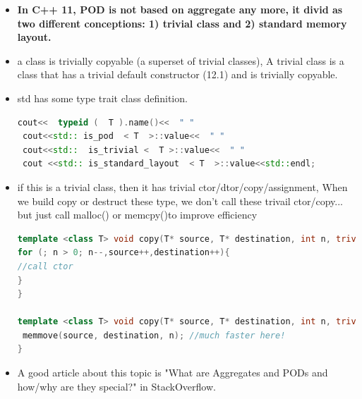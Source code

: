 \documentclass[a4paper,12pt,twoside]{book}
\begin{document}
\begin{itemize}
\item \textbf{In C++ 11, POD is not based on aggregate any more, it divid as two different conceptions: 1) trivial class and 2) standard memory layout. }

\item a class is trivially copyable (a superset of trivial classes), A trivial class is a class that has a trivial default constructor (12.1) and is trivially copyable.

\item std has some type trait class definition. 
\begin{lstlisting}[frame=single, language=c++]
 cout<<  typeid (  T ).name()<<  " "  
 cout<<std:: is_pod  < T  >::value<<  " " 
 cout<<std::  is_trivial <  T >::value<<  " "  
 cout <<std:: is_standard_layout  < T  >::value<<std::endl;
 \end{lstlisting}
 
\item if this is a trivial class, then it has trivial ctor/dtor/copy/assignment, When we build copy or destruct these type, we don't call these trivail ctor/copy... but just call malloc() or memcpy()to improve efficiency 

\begin{lstlisting}[frame=single, language=c++]
template <class T> void copy(T* source, T* destination, int n, trivial_false_type){
for (; n > 0; n--,source++,destination++){
//call ctor
}
}

template <class T> void copy(T* source, T* destination, int n, trivial_true_type){
 memmove(source, destination, n); //much faster here!
}
\end{lstlisting}

\item A good article about this topic is "What are Aggregates and PODs and how/why are they special?" in StackOverflow. 

\end{itemize}
\end{document}

